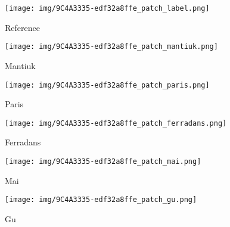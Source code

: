 \documentclass[journal]{IEEEtran}
\begin{document}
\begin{figure*}[t]
        \centering
        \begin{subfigure}[b]{0.24\textwidth}  
            \centering 
            \texttt{[image: img/9C4A3335-edf32a8ffe\_patch\_label.png]}
            \caption[]%
            {{\small Reference }}    
            \label{fig:mean and std of net24}
        \end{subfigure}
        \begin{subfigure}[b]{0.24\textwidth}  
            \centering 
            \texttt{[image: img/9C4A3335-edf32a8ffe\_patch\_mantiuk.png]}
            \caption[]%
            {{\small Mantiuk \cite{mantiuk2008display} }}    
            \label{fig:mean and std of net24}
        \end{subfigure}
        \begin{subfigure}[b]{0.24\textwidth}   
            \centering 
            \texttt{[image: img/9C4A3335-edf32a8ffe\_patch\_paris.png]}
            \caption[]%
            {{\small Paris \cite{paris2015local} }}    
            \label{fig:mean and std of net34}
        \end{subfigure}
        \begin{subfigure}[b]{0.24\textwidth}   
            \centering 
            \texttt{[image: img/9C4A3335-edf32a8ffe\_patch\_ferradans.png]}
            \caption[]%
            {{\small Ferradans \cite{ferradans2011analysis}     }}    
            \label{fig:mean and std of net44}
        \end{subfigure}
        \label{fig:mean and std of nets}
        \centering
        \begin{subfigure}[b]{0.24\textwidth}
            \centering
            \texttt{[image: img/9C4A3335-edf32a8ffe\_patch\_mai.png]}
            \caption[]%
            {{\small Mai \cite{mai2011optimizing} }}    
            \label{fig:mean and std of net14}
        \end{subfigure}
        \begin{subfigure}[b]{0.24\textwidth}
            \centering
            \texttt{[image: img/9C4A3335-edf32a8ffe\_patch\_gu.png]}
            \caption[]%
            {{\small Gu \cite{gu2013local} }}    
            \label{fig:mean and std of net14}

\end{subfigure}
\end{figure*}
\end{document}
